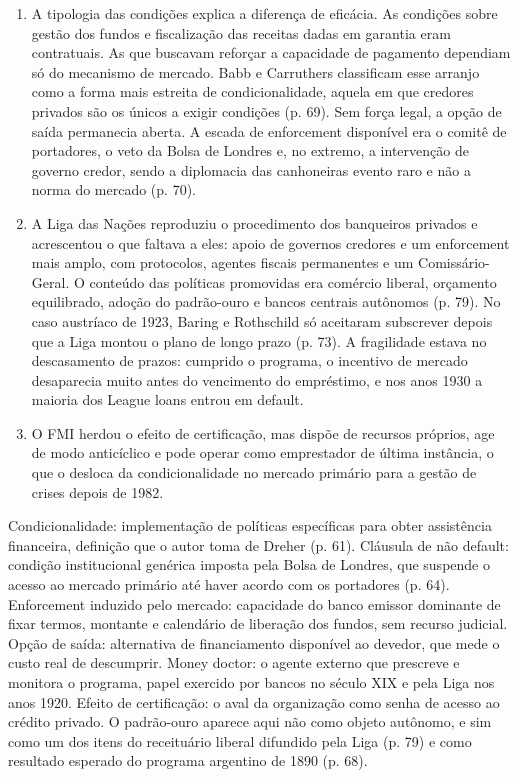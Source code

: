 \begin{enumerate}
\item A tipologia das condições explica a diferença de eficácia. As condições
sobre gestão dos fundos e fiscalização das receitas dadas em garantia eram
contratuais. As que buscavam reforçar a capacidade de pagamento dependiam só do
mecanismo de mercado. Babb e Carruthers classificam esse arranjo como a forma
mais estreita de condicionalidade, aquela em que credores privados são os únicos
a exigir condições (p. 69). Sem força legal, a opção de saída permanecia aberta.
A escada de enforcement disponível era o comitê de portadores, o veto da Bolsa
de Londres e, no extremo, a intervenção de governo credor, sendo a diplomacia
das canhoneiras evento raro e não a norma do mercado (p. 70).

\item A Liga das Nações reproduziu o procedimento dos banqueiros privados e
acrescentou o que faltava a eles: apoio de governos credores e um enforcement
mais amplo, com protocolos, agentes fiscais permanentes e um Comissário-Geral. O
conteúdo das políticas promovidas era comércio liberal, orçamento equilibrado,
adoção do padrão-ouro e bancos centrais autônomos (p. 79). No caso austríaco de
1923, Baring e Rothschild só aceitaram subscrever depois que a Liga montou o
plano de longo prazo (p. 73). A fragilidade estava no descasamento de prazos:
cumprido o programa, o incentivo de mercado desaparecia muito antes do
vencimento do empréstimo, e nos anos 1930 a maioria dos League loans entrou em
default.

\item O FMI herdou o efeito de certificação, mas dispõe de recursos próprios,
age de modo anticíclico e pode operar como emprestador de última instância, o
que o desloca da condicionalidade no mercado primário para a gestão de crises
depois de 1982.
\end{enumerate}



Condicionalidade: implementação de políticas específicas para obter assistência
financeira, definição que o autor toma de Dreher (p. 61). Cláusula de não
default: condição institucional genérica imposta pela Bolsa de Londres, que
suspende o acesso ao mercado primário até haver acordo com os portadores
(p. 64). Enforcement induzido pelo mercado: capacidade do banco emissor
dominante de fixar termos, montante e calendário de liberação dos fundos, sem
recurso judicial. Opção de saída: alternativa de financiamento disponível ao
devedor, que mede o custo real de descumprir. Money doctor: o agente externo que
prescreve e monitora o programa, papel exercido por bancos no século XIX e pela
Liga nos anos 1920. Efeito de certificação: o aval da organização como senha de
acesso ao crédito privado. O padrão-ouro aparece aqui não como objeto autônomo,
e sim como um dos itens do receituário liberal difundido pela Liga (p. 79) e
como resultado esperado do programa argentino de 1890 (p. 68).

